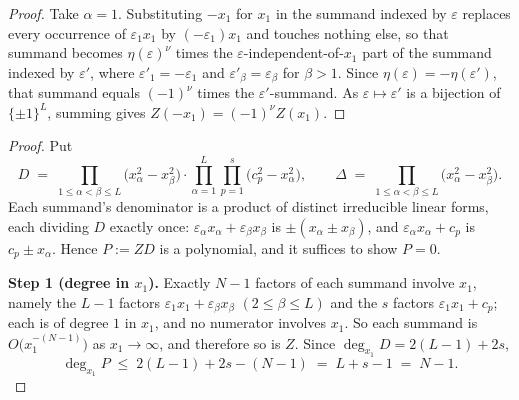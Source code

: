 \documentclass[11pt]{article}
\theoremstyle{definition}
\theoremstyle{remark}
\begin{document}
\begin{proof}
Take $\alpha=1$. Substituting $-x_1$ for $x_1$ in the summand indexed by $\varepsilon$
replaces every occurrence of $\varepsilon_1x_1$ by $(-\varepsilon_1)x_1$ and touches
nothing else, so that summand becomes
$\eta(\varepsilon)^{\nu}$ times the $\varepsilon$-independent-of-$x_1$ part of the
summand indexed by $\varepsilon'$, where $\varepsilon'_1=-\varepsilon_1$ and
$\varepsilon'_\beta=\varepsilon_\beta$ for $\beta>1$. Since
$\eta(\varepsilon)=-\eta(\varepsilon')$, that summand equals $(-1)^{\nu}$ times the
$\varepsilon'$-summand. As $\varepsilon\mapsto\varepsilon'$ is a bijection of
$\{\pm1\}^L$, summing gives $Z(-x_1)=(-1)^{\nu}Z(x_1)$.
\end{proof}

\begin{proof}
Put
\[
  D\;=\;\prod_{1\le\alpha<\beta\le L}\bigl(x_\alpha^2-x_\beta^2\bigr)\cdot
        \prod_{\alpha=1}^{L}\prod_{p=1}^{s}\bigl(c_p^2-x_\alpha^2\bigr),
  \qquad
  \Delta\;=\;\prod_{1\le\alpha<\beta\le L}\bigl(x_\alpha^2-x_\beta^2\bigr).
\]
Each summand's denominator is a product of distinct irreducible linear forms, each
dividing $D$ exactly once: $\varepsilon_\alpha x_\alpha+\varepsilon_\beta x_\beta$ is
$\pm(x_\alpha\pm x_\beta)$, and $\varepsilon_\alpha x_\alpha+c_p$ is
$c_p\pm x_\alpha$. Hence $P:=ZD$ is a polynomial, and it suffices to show $P=0$.

\smallskip\noindent\textbf{Step 1 (degree in $x_1$).} Exactly $N-1$ factors of each
summand involve $x_1$, namely the $L-1$ factors
$\varepsilon_1x_1+\varepsilon_\beta x_\beta$ $(2\le\beta\le L)$ and the $s$ factors
$\varepsilon_1x_1+c_p$; each is of degree $1$ in $x_1$, and no numerator involves
$x_1$. So each summand is $O\bigl(x_1^{-(N-1)}\bigr)$ as $x_1\to\infty$, and therefore
so is $Z$. Since $\deg_{x_1}D=2(L-1)+2s$,
\begin{equation}\label{eq:degbound}
  \deg_{x_1}P\;\le\;2(L-1)+2s-(N-1)\;=\;L+s-1\;=\;N-1 .
\end{equation}


\end{proof}
\end{document}
